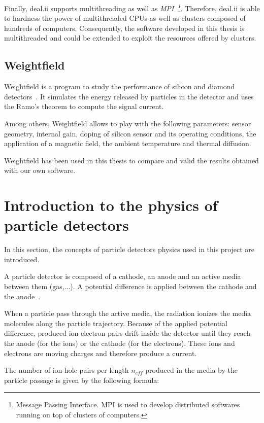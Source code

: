 \documentclass[11pt]{article}
\begin{document}
		Finally, deal.ii supports multithreading as well as \textit{MPI~\footnote{Message
		Passing Interface. MPI is used to develop distributed softwares running on top of
		clusters of computers.}}. Therefore,
		deal.ii is able to hardness the power of multithreaded CPUs as well as
		clusters composed of hundreds of computers. Consequently,
		the software developed in this thesis is multithreaded and could be extended to
		exploit the resources offered by clusters.


	\subsection{Weightfield}

		Weightfield is a program to study the performance of silicon and diamond
		detectors~\cite{Cenna2015}. It simulates the energy released by particles in the detector
		and uses the Ramo's theorem to compute the signal current.

		Among others, Weightfield allows to play with the following parameters:
		sensor geometry, internal gain, doping of silicon sensor and its operating
		conditions, the application of a magnetic field, the ambient temperature and
		thermal diffusion.

		Weightfield has been used in this thesis to compare and valid the results
		obtained with our own software.

\section{Introduction to the physics of particle detectors}

	\label{equations}

	In this section, the concepts of particle detectors physics used in this project
	are introduced.

	A particle detector is composed of a cathode, an anode and an active media
	between them (gas,...). A potential difference is applied between the cathode
	and the anode~\cite{lphy2236}.

	When a particle pass through the active media, the radiation ionizes the media
	molecules along the particle trajectory.
	Because of the applied potential difference,
	produced ion-electron pairs drift inside the detector until they reach the anode
	(for the ions) or the cathode (for the electrons). These ions and electrons
	are moving charges and therefore produce a current.

	The number of ion-hole pairs per length $n_{eff}$ produced in the media by the
	particle passage is given by the following formula:
\end{document}
